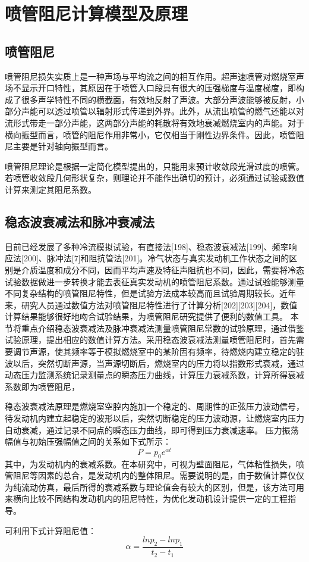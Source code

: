 \chapter{喷管阻尼计算模型及原理}
\section{喷管阻尼}
喷管阻尼损失实质上是一种声场与平均流之间的相互作用。超声速喷管对燃烧室声场不显示开口特性，其原因在于喷管入口段具有很大的压强梯度与温度梯度，即构成了很多声学特性不同的横截面，有效地反射了声波。大部分声波能够被反射，小部分声能可以透过喷管以辐射形式传递到外界。此外，从流出喷管的燃气还能以对流形式带走一部分声能，这两部分声能的耗散将有效地衰减燃烧室内的声能。对于横向振型而言，喷管的阻尼作用非常小，它仅相当于刚性边界条件。因此，喷管阻尼主要是针对轴向振型而言。

喷管阻尼理论是根据一定简化模型提出的，只能用来预计收敛段光滑过度的喷管。若喷管收敛段几何形状复杂，则理论并不能作出确切的预计，必须通过试验或数值计算来测定其阻尼系数。

\section{稳态波衰减法和脉冲衰减法}
目前已经发展了多种冷流模拟试验，有直接法[198]、稳态波衰减法[199]、频率响应法[200]、脉冲法[7]和阻抗管法[201]。冷气状态与真实发动机工作状态之间的区别是介质温度和成分不同，因而平均声速及特征声阻抗也不同，因此，需要将冷态试验数据做进一步转换才能去表征真实发动机的喷管阻尼系数。通过试验能够测量不同复杂结构的喷管阻尼特性，但是试验方法成本较高而且试验周期较长。近年来，研究人员通过数值方法对喷管阻尼特性进行了计算分析[202][203][204]，数值计算结果能够很好地吻合试验结果，为喷管阻尼研究提供了便利的数值工具。
本节将重点介绍稳态波衰减法及脉冲衰减法测量喷管阻尼常数的试验原理，通过借鉴试验原理，提出相应的数值计算方法。采用稳态波衰减法测量喷管阻尼时，首先需要调节声源，使其频率等于模拟燃烧室中的某阶固有频率，待燃烧内建立稳定的驻波以后，突然切断声源，当声源切断后，燃烧室内的压力将以指数形式衰减，通过动态压力监测系统记录测量点的瞬态压力曲线，计算压力衰减系数，计算所得衰减系数即为喷管阻尼，

稳态波衰减法原理是燃烧室空腔内施加一个稳定的、周期性的正弦压力波动信号，待发动机内建立起稳定的波形以后，突然切断稳定的压力波动源，让燃烧室内压力自动衰减，通过记录不同点的瞬态压力曲线，即可得到压力衰减速率。
压力振荡幅值与初始压强幅值之间的关系如下式所示：
\begin{equation}
P=p_0 e^{\alpha t}\label{eq:yaqiang}
\end{equation}
其中，为发动机内的衰减系数。在本研究中，可视为壁面阻尼，气体粘性损失，喷管阻尼等因素的总合，是发动机内的整体阻尼。需要说明的是，由于数值计算仅仅为纯流动仿真，最后所得的衰减系数与理论值会有较大的区别，但是，该方法可用来横向比较不同结构发动机内的阻尼特性，为优化发动机设计提供一定的工程指导。

可利用下式计算阻尼值：
\begin{equation}
\alpha=\dfrac{lnp_2-lnp_1}{t_2-t_1}\label{eq:zuning}
\end{equation}
